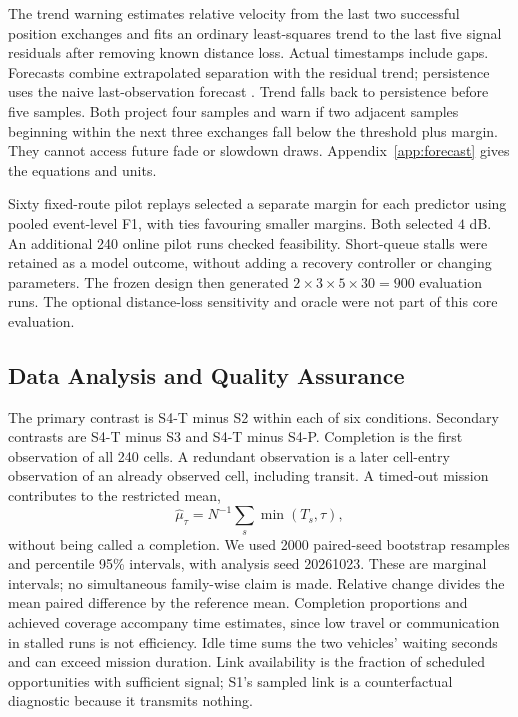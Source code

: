 The trend warning estimates relative velocity from the last two successful position exchanges and fits an ordinary least-squares trend \cite{nistLeastSquares} to the last five signal residuals after removing known distance loss. Actual timestamps include gaps. Forecasts combine extrapolated separation with the residual trend; persistence uses the naive last-observation forecast \cite{hyndman2021forecasting}. Trend falls back to persistence before five samples. Both project four samples and warn if two adjacent samples beginning within the next three exchanges fall below the threshold plus margin. They cannot access future fade or slowdown draws. Appendix~\ref{app:forecast} gives the equations and units.

Sixty fixed-route pilot replays selected a separate margin for each predictor using pooled event-level F1, with ties favouring smaller margins. Both selected $4$ dB. An additional 240 online pilot runs checked feasibility. Short-queue stalls were retained as a model outcome, without adding a recovery controller or changing parameters. The frozen design then generated $2\times3\times5\times30=900$ evaluation runs. The optional distance-loss sensitivity and oracle were not part of this core evaluation.

\subsection{Data Analysis and Quality Assurance}
The primary contrast is S4-T minus S2 within each of six conditions. Secondary contrasts are S4-T minus S3 and S4-T minus S4-P. Completion is the first observation of all 240 cells. A redundant observation is a later cell-entry observation of an already observed cell, including transit. A timed-out mission contributes to the restricted mean,
\begin{equation}
\widehat\mu_\tau=N^{-1}\sum_s\min(T_s,\tau),
\end{equation}
without being called a completion. We used 2000 paired-seed bootstrap resamples and percentile 95\% intervals, with analysis seed 20261023. These are marginal intervals; no simultaneous family-wise claim is made. Relative change divides the mean paired difference by the reference mean. Completion proportions and achieved coverage accompany time estimates, since low travel or communication in stalled runs is not efficiency. Idle time sums the two vehicles' waiting seconds and can exceed mission duration. Link availability is the fraction of scheduled opportunities with sufficient signal; S1's sampled link is a counterfactual diagnostic because it transmits nothing.

